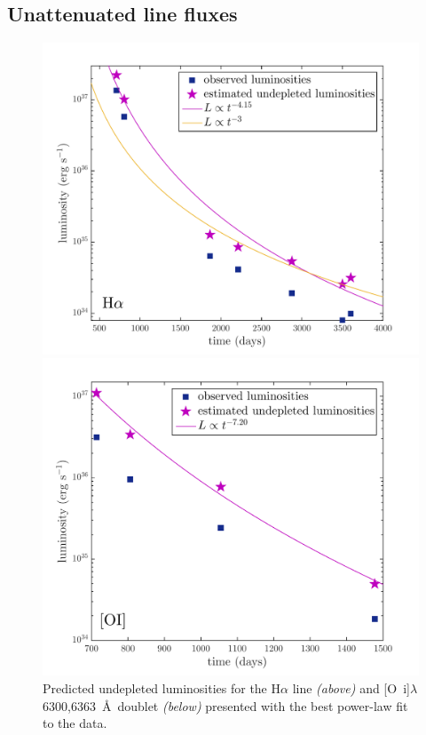 \subsection{Unattenuated line fluxes}

\begin{figure}
\centering
\includegraphics[clip=true,scale=0.6]{chapters/chapter5/images/undep_fluxes_Ha.pdf}

\includegraphics[clip=true,scale=0.6]{chapters/chapter5/images/undep_lum_OI.pdf}
\caption{Predicted undepleted luminosities for the H$\alpha$ line 
\textit{(above)} and [O~{\sc i}]$\lambda$6300,6363~\AA\ doublet 
\textit{(below)} presented with the best power-law fit to the data.}
\label{undep}
\end{figure}

